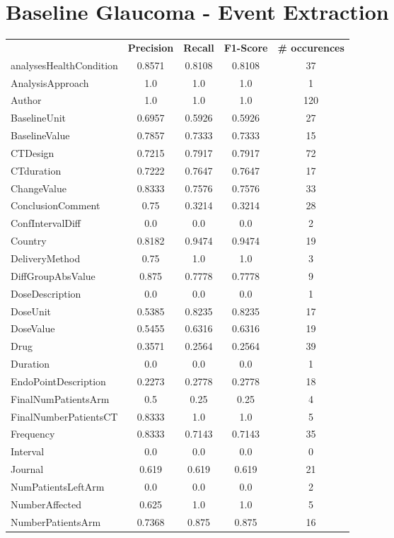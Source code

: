 \section{Baseline Glaucoma - Event Extraction}
\begin{longtable}{ l c c c c}
 & \textbf{Precision} & \textbf{Recall} & \textbf{F1-Score} & \textbf{\# occurences} \\ \cline{1-5}
analysesHealthCondition & 0.8571 & 0.8108 & 0.8108 & 37\\
AnalysisApproach & 1.0 & 1.0 & 1.0 & 1\\
Author & 1.0 & 1.0 & 1.0 & 120\\
BaselineUnit & 0.6957 & 0.5926 & 0.5926 & 27\\
BaselineValue & 0.7857 & 0.7333 & 0.7333 & 15\\
CTDesign & 0.7215 & 0.7917 & 0.7917 & 72\\
CTduration & 0.7222 & 0.7647 & 0.7647 & 17\\
ChangeValue & 0.8333 & 0.7576 & 0.7576 & 33\\
ConclusionComment & 0.75 & 0.3214 & 0.3214 & 28\\
ConfIntervalDiff & 0.0 & 0.0 & 0.0 & 2\\
Country & 0.8182 & 0.9474 & 0.9474 & 19\\
DeliveryMethod & 0.75 & 1.0 & 1.0 & 3\\
DiffGroupAbsValue & 0.875 & 0.7778 & 0.7778 & 9\\
DoseDescription & 0.0 & 0.0 & 0.0 & 1\\
DoseUnit & 0.5385 & 0.8235 & 0.8235 & 17\\
DoseValue & 0.5455 & 0.6316 & 0.6316 & 19\\
Drug & 0.3571 & 0.2564 & 0.2564 & 39\\
Duration & 0.0 & 0.0 & 0.0 & 1\\
EndoPointDescription & 0.2273 & 0.2778 & 0.2778 & 18\\
FinalNumPatientsArm & 0.5 & 0.25 & 0.25 & 4\\
FinalNumberPatientsCT & 0.8333 & 1.0 & 1.0 & 5\\
Frequency & 0.8333 & 0.7143 & 0.7143 & 35\\
Interval & 0.0 & 0.0 & 0.0 & 0\\
Journal & 0.619 & 0.619 & 0.619 & 21\\
NumPatientsLeftArm & 0.0 & 0.0 & 0.0 & 2\\
NumberAffected & 0.625 & 1.0 & 1.0 & 5\\
NumberPatientsArm & 0.7368 & 0.875 & 0.875 & 16\\

\end{longtable}
